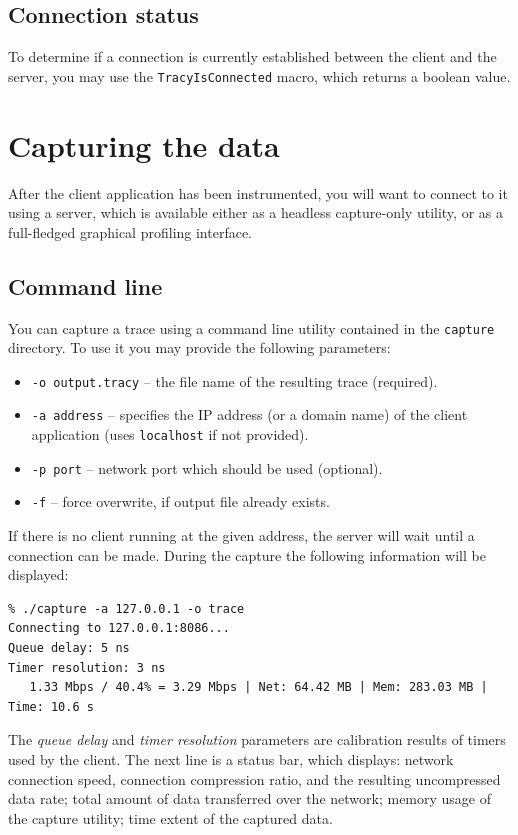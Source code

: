 \documentclass[hidelinks,titlepage,a4paper]{article}
\begin{document}
\subsection{Connection status}

To determine if a connection is currently established between the client and the server, you may use the \texttt{TracyIsConnected} macro, which returns a boolean value.

\section{Capturing the data}
\label{capturing}

After the client application has been instrumented, you will want to connect to it using a server, which is available either as a headless capture-only utility, or as a full-fledged graphical profiling interface.

\subsection{Command line}

You can capture a trace using a command line utility contained in the \texttt{capture} directory. To use it you may provide the following parameters:

\begin{itemize}
\item \texttt{-o output.tracy} -- the file name of the resulting trace (required).
\item \texttt{-a address} -- specifies the IP address (or a domain name) of the client application (uses \texttt{localhost} if not provided).
\item \texttt{-p port} -- network port which should be used (optional).
\item \texttt{-f} -- force overwrite, if output file already exists.
\end{itemize}

If there is no client running at the given address, the server will wait until a connection can be made. During the capture the following information will be displayed:

\begin{verbatim}
% ./capture -a 127.0.0.1 -o trace
Connecting to 127.0.0.1:8086...
Queue delay: 5 ns
Timer resolution: 3 ns
   1.33 Mbps / 40.4% = 3.29 Mbps | Net: 64.42 MB | Mem: 283.03 MB | Time: 10.6 s
\end{verbatim}

The \emph{queue delay} and \emph{timer resolution} parameters are calibration results of timers used by the client. The next line is a status bar, which displays: network connection speed, connection compression ratio, and the resulting uncompressed data rate; total amount of data transferred over the network; memory usage of the capture utility; time extent of the captured data.
\end{document}
